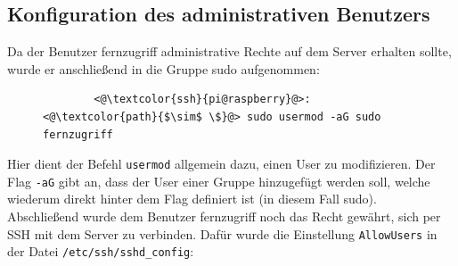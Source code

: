 \documentclass[a4paper, 11pt]{scrartcl}
\begin{document}
\subsection{Konfiguration des administrativen Benutzers}\label{ch:user_admincfg}
Da der Benutzer \glqq fernzugriff\grqq{} administrative Rechte auf dem Server erhalten sollte, wurde er anschließend in die Gruppe \glqq sudo\grqq{} aufgenommen:
\begin{figure}[H]
    \begin{mdframed}[backgroundcolor=bbg]
        \begin{lstlisting}
        <@\textcolor{ssh}{pi@raspberry}@>:<@\textcolor{path}{$\sim$ \$}@> sudo usermod -aG sudo fernzugriff
        \end{lstlisting}
    \end{mdframed}
    \label{lst:usermod_fernzugriff}
\end{figure}
Hier dient der Befehl \lstinline[basicstyle={\small\ttfamily\color{black}}]|usermod| allgemein dazu, einen User zu modifizieren. Der Flag \lstinline[basicstyle={\small\ttfamily\color{black}}]|-aG| gibt an,
dass der User einer Gruppe hinzugefügt werden soll, welche wiederum direkt hinter dem Flag definiert ist (in diesem Fall \glqq sudo\grqq).
\\
Abschließend wurde dem Benutzer \glqq fernzugriff\grqq{} noch das Recht gewährt, sich per SSH mit dem Server zu verbinden. Dafür wurde die Einstellung \lstinline[basicstyle={\small\ttfamily\color{black}}]|AllowUsers|
in der Datei \lstinline[basicstyle={\small\ttfamily\color{black}}]|/etc/ssh/sshd_config|:
\end{document}
